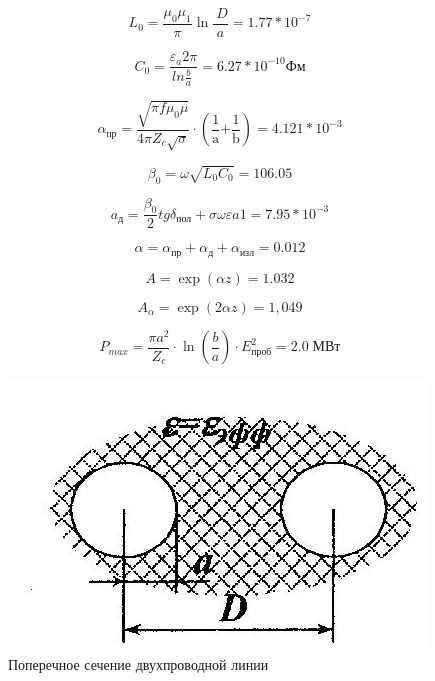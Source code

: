 \documentclass[fontsize=14pt,a4paper]{scrartcl}
\begin{document}
    \begin{equation}
      L_0=\frac{\mu_0\mu_1}{\pi}\ln{\frac{\ D}{a}=1.77\ast{10}^{-7}}
    \end{equation}

    \begin{equation}
      C_0=\frac{\varepsilon_a2\pi}{ln\frac{b}{a}\ }=6.27\ast10^{-10}Фм
    \end{equation}

    \begin{equation}
      \alpha_\text{пр}=\frac{\sqrt{\pi f\mu_0\mu}}{4\pi Z_c \sqrt\sigma}\cdot\left(\frac{\mathrm{1}}{\mathrm{a}}\mathrm{+} \frac{\mathrm{1} }{\mathrm{b}}\right)\mathrm{=4.121*}{\mathrm{10}}^{\mathrm{-3}}
    \end{equation}

    \begin{equation}
      \beta_0=\omega\sqrt{L_0C_0}=106.05
    \end{equation}

    \begin{equation}
      a_\text{д}=\frac{\beta_0}{2}tg\delta_\text{пол}+σωεa1=7.95*10^{-3}
    \end{equation}

    \begin{equation}
      \alpha=\alpha_\text{пр}+\alpha_\text{д}+\alpha_\text{изл}=0.012
    \end{equation}

    \begin{equation}
      A=\exp{\left(\alpha z\right)}=1.032
    \end{equation}

    \begin{equation}
      A_\alpha=\exp{\left(2\alpha z\right)}=1,049
    \end{equation}

    \begin{equation}
      P_{max}=\frac{\pi a^2}{Z_c}\cdot\ln{\left(\frac{b}{a}\right)}\cdot E_\text{проб}^2=2.0 \; \text{МВт}
    \end{equation}

    \begin{figure}[h!]
      \centering
      \includegraphics[scale=0.6]{data/lab_5/fig/2.png}
      \caption{Поперечное сечение двухпроводной линии}
      \label{fig:ris2}
    \end{figure}
\end{document}

